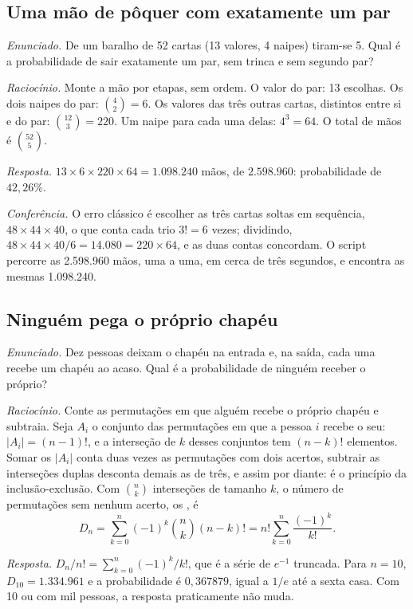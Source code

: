 \subsection{Uma mão de pôquer com exatamente um par}

\emph{Enunciado.} De um baralho de 52 cartas (13 valores, 4 naipes) tiram-se 5. Qual é a probabilidade de sair exatamente um par, sem trinca e sem segundo par?

\emph{Raciocínio.} Monte a mão por etapas, sem ordem. O valor do par: 13 escolhas. Os dois naipes do par: $\binom{4}{2} = 6$. Os valores das três outras cartas, distintos entre si e do par: $\binom{12}{3} = 220$. Um naipe para cada uma delas: $4^3 = 64$. O total de mãos é $\binom{52}{5}$.

\emph{Resposta.} $13 \times 6 \times 220 \times 64 = 1.098.240$ mãos, de $2.598.960$: probabilidade de $42,26\%$.

\emph{Conferência.} O erro clássico é escolher as três cartas soltas em sequência, $48 \times 44 \times 40$, o que conta cada trio $3! = 6$ vezes; dividindo, $48 \times 44 \times 40 / 6 = 14.080 = 220 \times 64$, e as duas contas concordam. O script percorre as 2.598.960 mãos, uma a uma, em cerca de três segundos, e encontra as mesmas 1.098.240.

\subsection{Ninguém pega o próprio chapéu}

\emph{Enunciado.} Dez pessoas deixam o chapéu na entrada e, na saída, cada uma recebe um chapéu ao acaso. Qual é a probabilidade de ninguém receber o próprio?

\emph{Raciocínio.} Conte as permutações em que alguém recebe o próprio chapéu e subtraia. Seja $A_i$ o conjunto das permutações em que a pessoa $i$ recebe o seu: $|A_i| = (n-1)!$, e a interseção de $k$ desses conjuntos tem $(n-k)!$ elementos. Somar os $|A_i|$ conta duas vezes as permutações com dois acertos, subtrair as interseções duplas desconta demais as de três, e assim por diante: é o princípio da inclusão-exclusão. Com $\binom{n}{k}$ interseções de tamanho $k$, o número de permutações sem nenhum acerto, os , é
\begin{equation*}
  D_n = \sum_{k=0}^{n} (-1)^k \binom{n}{k} (n-k)! = n! \sum_{k=0}^{n} \frac{(-1)^k}{k!} .
\end{equation*}

\emph{Resposta.} $D_n/n! = \sum_{k=0}^{n} (-1)^k/k!$, que é a série de $e^{-1}$ truncada. Para $n = 10$, $D_{10} = 1.334.961$ e a probabilidade é $0,367879$, igual a $1/e$ até a sexta casa. Com 10 ou com mil pessoas, a resposta praticamente não muda.

